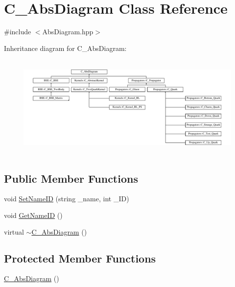 \hypertarget{class_c___abs_diagram}{\section{C\-\_\-\-Abs\-Diagram Class Reference}
\label{class_c___abs_diagram}
}


{\ttfamily \#include $<$Abs\-Diagram.\-hpp$>$}

Inheritance diagram for C\-\_\-\-Abs\-Diagram\-:\begin{figure}[H]
\begin{center}
\leavevmode
\includegraphics[height=5.116752cm]{class_c___abs_diagram}
\end{center}
\end{figure}
\subsection*{Public Member Functions}
\begin{DoxyCompactItemize}
\item 
void \hyperlink{class_c___abs_diagram_a88baf4e9d29753417b7e65ef18f0b28f}{Set\-Name\-I\-D} (string \-\_\-name, int \-\_\-\-I\-D)
\item 
void \hyperlink{class_c___abs_diagram_a5a52da1cfd635da06a6bfdd002e7f674}{Get\-Name\-I\-D} ()
\item 
virtual \hyperlink{class_c___abs_diagram_a0fdd41051f27b3a6d8bf4ae75914d830}{$\sim$\-C\-\_\-\-Abs\-Diagram} ()
\end{DoxyCompactItemize}
\subsection*{Protected Member Functions}
\begin{DoxyCompactItemize}
\item 
\hyperlink{class_c___abs_diagram_a4b5e3fe8526b18145f92283e34d0f908}{C\-\_\-\-Abs\-Diagram} ()
\end{DoxyCompactItemize}

